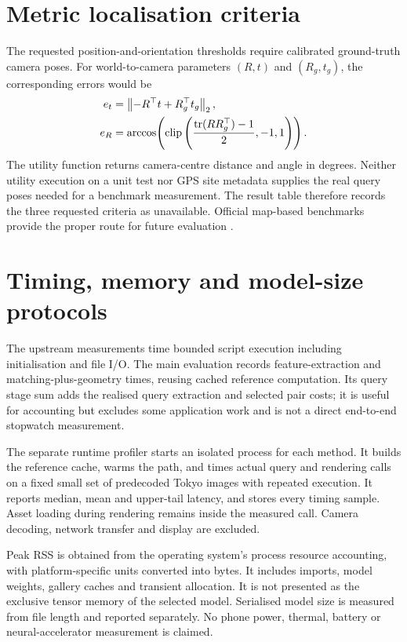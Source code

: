 \ifFullReport
\section{Metric localisation criteria}
The requested position-and-orientation thresholds require calibrated ground-truth camera poses. For world-to-camera parameters $(R,t)$ and $(R_g,t_g)$, the corresponding errors would be
\begin{align}
 e_t&=\left\lVert-R^\top t+R_g^\top t_g\right\rVert_2,\\
 e_R&=\arccos\!\left(\operatorname{clip}\left(\frac{\operatorname{tr}(RR_g^\top)-1}{2},-1,1\right)\right).
\end{align}
The utility function returns camera-centre distance and angle in degrees. Neither utility execution on a unit test nor GPS site metadata supplies the real query poses needed for a benchmark measurement. The result table therefore records the three requested criteria as unavailable. Official map-based benchmarks provide the proper route for future evaluation \citep{localizationbenchmark}.
\fi

\section{Timing, memory and model-size protocols}
The upstream measurements time bounded script execution including initialisation and file I/O. The main evaluation records feature-extraction and matching-plus-geometry times, reusing cached reference computation. Its query stage sum adds the realised query extraction and selected pair costs; it is useful for accounting but excludes some application work and is not a direct end-to-end stopwatch measurement.

The separate runtime profiler starts an isolated process for each method. It builds the reference cache, warms the path, and times actual query and rendering calls on a fixed small set of predecoded Tokyo images with repeated execution. It reports median, mean and upper-tail latency, and stores every timing sample. Asset loading during rendering remains inside the measured call. Camera decoding, network transfer and display are excluded.

Peak RSS is obtained from the operating system's process resource accounting, with platform-specific units converted into bytes. It includes imports, model weights, gallery caches and transient allocation. It is not presented as the exclusive tensor memory of the selected model. Serialised model size is measured from file length and reported separately. No phone power, thermal, battery or neural-accelerator measurement is claimed.

